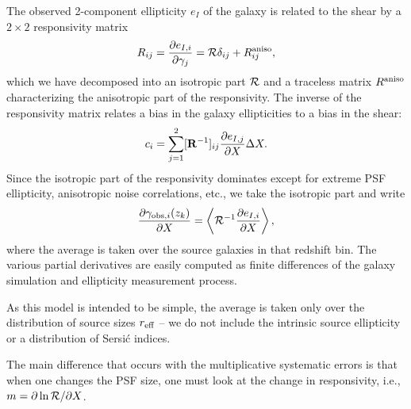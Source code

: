 \documentclass[aps,prd, amsmath,amssymb,superscriptaddress,showkeys,nofootinbib,reprint,preprintnumbers]{revtex4-1}
\begin{document}
The observed 2-component ellipticity $e_I$ of the galaxy is related to
the shear by a $2\times 2$ responsivity matrix
\begin{equation}
R_{ij} = \frac{\partial e_{I,i}}{\partial\gamma_j} = {\cal R}\delta_{ij} + R^{\rm aniso}_{ij},
\end{equation}
which we have decomposed into an isotropic part ${\cal R}$ and a
traceless matrix $R^{\rm aniso}$ characterizing the anisotropic part
of the responsivity. The inverse of the responsivity matrix relates a
bias in the galaxy ellipticities to a bias in the shear:
\begin{equation}
c_i = \sum_{j=1}^2 [{\bf R}^{-1}]_{ij} \frac{\partial e_{I,j}}{\partial X} \Delta X.
\end{equation}
Since the isotropic part of the responsivity dominates except for
extreme PSF ellipticity, anisotropic noise correlations, etc., we take
the isotropic part and write
\begin{equation}
\frac{\partial\gamma_{{\rm obs},i}(z_k)}{\partial X} = \left\langle {\cal R}^{-1} \frac{\partial e_{I,i}}{\partial X} \right\rangle,
\end{equation}
where the average is taken over the source galaxies in that redshift
bin. The various partial derivatives are easily computed as finite
differences of the galaxy simulation and ellipticity measurement
process.

As this model is intended to be simple, the average is taken only over
the distribution of source sizes $r_{\rm eff}$ -- we do not include
the intrinsic source ellipticity or a distribution of Sersi\'c
indices.

The main difference that occurs with the multiplicative systematic errors is that when one changes the PSF size, one must look at the change in responsivity, i.e., $m = \partial \ln {\cal R}/\partial X$.

\end{document}
